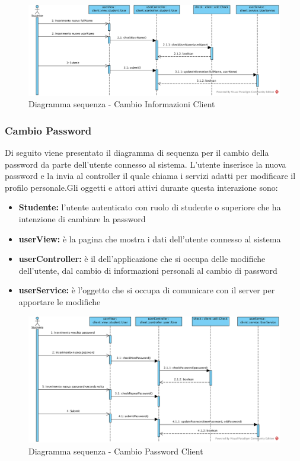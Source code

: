 \documentclass[12pt,a4paper]{article}
\begin{document}
\begin{center}
	\begin{figure}[H]
		\centering \includegraphics[max width=\myheight, angle=90]{../img/diagrammiSequenza/cambioInfoClient.png}
		\caption{Diagramma sequenza - Cambio Informazioni Client}
	\end{figure}
\end{center}

\newpage
\subsubsection{Cambio Password}
Di seguito viene presentato il diagramma di sequenza per il cambio della password da parte dell'utente connesso al sistema. L'utente inserisce la nuova password e la invia al controller il quale chiama i servizi adatti per modificare il profilo personale.Gli oggetti e attori attivi durante questa interazione sono:

\begin{itemize}
	\item \textbf{Studente:}  l'utente autenticato con ruolo di studente o superiore che ha intenzione di cambiare la password
	\item \textbf{userView:} è la pagina che mostra i dati dell'utente connesso al sistema
	\item \textbf{userController:} è il  dell'applicazione che si occupa delle modifiche dell'utente, dal cambio di informazioni personali al cambio di password
	\item \textbf{userService:} è l'oggetto che si occupa di comunicare con il server per apportare le modifiche
\end{itemize}

\begin{center}
	\begin{figure}[H]
		\centering \includegraphics[max width=\myheight, angle=90]{../img/diagrammiSequenza/cambioPasswordClient.png}
		\caption{Diagramma sequenza - Cambio Password Client}
	\end{figure}
\end{center}
\end{document}
